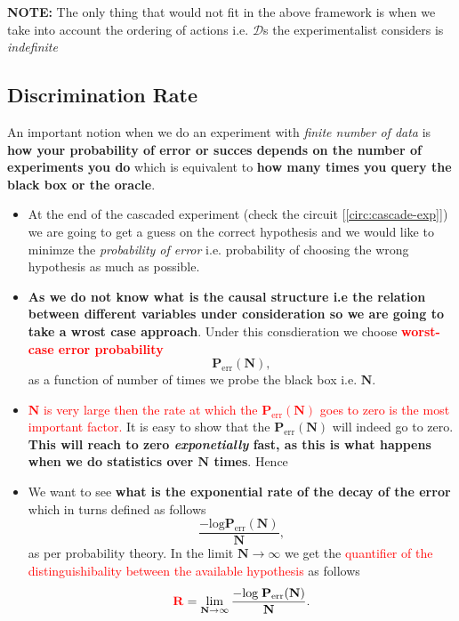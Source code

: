 \documentclass[a4paper,11pt]{article}
\begin{document}
	\noindent\textbf{NOTE:} The only thing that would not fit in the above framework is when we take into account the ordering of actions i.e. $\mathcal{D}$s the experimentalist considers is \textit{indefinite}
	
	\subsection{Discrimination Rate}
	An important notion when we do an experiment with \textit{finite number of data} is \textbf{how your probability of error or succes depends on the number of experiments you do} which is equivalent to \textbf{how many times you query the black box or the oracle}.
	\\
	
	\begin{itemize}
	\item At the end of the cascaded experiment (check the circuit [\ref{circ:cascade-exp}]) we are going to get a guess on the correct hypothesis and we would like to minimze the \textit{probability of error} i.e. probability of choosing the wrong hypothesis as much as possible.
	\\
	
	\item \textbf{As we do not know what is the causal structure i.e the relation between different variables under consideration so we are going to take a wrost case approach}. Under this consdieration we choose \textbf{\textcolor{red}{worst-case error probability}}
	\begin{equation}
		\mathbf{P}_\text{err}(\mathbf{N}),
	\end{equation} 
	as a function of number of times we probe the black box i.e. $\mathbf{N}$.

	\item \textcolor{red}{$\mathbf{N}$ is very large then the rate at which the $\mathbf{P}_\text{err}(\mathbf{N})$ goes to zero is the most important factor.} It is easy to show that the $\mathbf{P}_\text{err}(\mathbf{N})$ will indeed go to zero. \textbf{This will reach to zero \textit{exponetially} fast, as this is what happens when we do statistics over $\mathbf{N}$ times}. Hence
	\item We want to see \textbf{what is the exponential rate of the decay of the error} which in turns defined as follows
	\begin{equation}
		\frac{-\text{log}\mathbf{P}_\text{err}(\mathbf{N})}{\mathbf{N}},\nonumber
	\end{equation}
	as per probability theory. In the limit $\mathbf{N}\rightarrow\infty$ we get the \textcolor{red}{quantifier of the distinguishibality between the available hypothesis} as follows
	\begin{equation}
		\mathbf{\textcolor{red}{R}} = \lim_{\mathbf{N}\rightarrow\infty} \frac{-\text{log}\;\mathbf{P}_\text{err}(\mathbf{N})}{\mathbf{N}}.
	\end{equation}
	\end{itemize}
\end{document}
